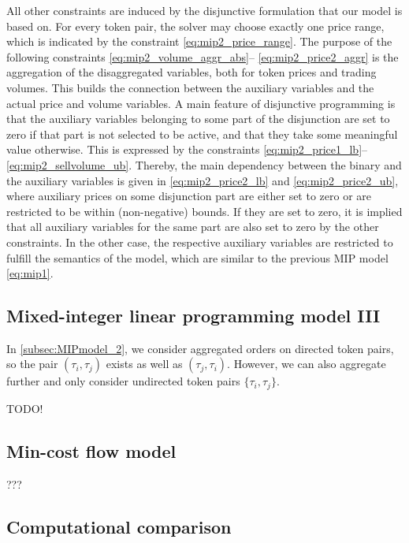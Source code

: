 \documentclass[11pt,parskip=full]{scrartcl}%
\begin{document}
All other constraints are induced by the disjunctive formulation that our model is based on.
For every token pair, the solver may choose exactly one price range, which is indicated by the
constraint \eqref{eq:mip2_price_range}.
The purpose of the following constraints \eqref{eq:mip2_volume_aggr_abs}--
\eqref{eq:mip2_price2_aggr} is the aggregation of the disaggregated variables, both for token
prices and trading volumes.
This builds the connection between the auxiliary variables and the actual price and volume
variables.
A main feature of disjunctive programming is that the auxiliary variables belonging to some part of
the disjunction are set to zero if that part is not selected to be active, and that they take
some meaningful value otherwise.
This is expressed by the constraints \eqref{eq:mip2_price1_lb}--\eqref{eq:mip2_sellvolume_ub}.
Thereby, the main dependency between the binary and the auxiliary variables is given in 
\eqref{eq:mip2_price2_lb} and \eqref{eq:mip2_price2_ub}, where auxiliary prices on some disjunction
part are either set to zero or are restricted to be within (non-negative) bounds.
If they are set to zero, it is implied that all auxiliary variables for the same part are also set
to zero by the other constraints.
In the other case, the respective auxiliary variables are restricted to fulfill the semantics of
the model, which are similar to the previous MIP model \eqref{eq:mip1}.


\subsection{Mixed-integer linear programming model III}
\label{subsec:MIPmodel_3}

In \ref{subsec:MIPmodel_2}, we consider aggregated orders on directed token pairs, so the pair $ 
(\tau_i,\tau_j) $ exists as well as $ (\tau_j,\tau_i) $.
However, we can also aggregate further and only consider undirected token pairs
$ \{\tau_i,\tau_j\} $.

TODO!


\subsection{Min-cost flow model}
\label{subsec:MCFmodel}

???


\newpage
\subsection{Computational comparison}
\label{subsec:computational_comparison}
\end{document}
